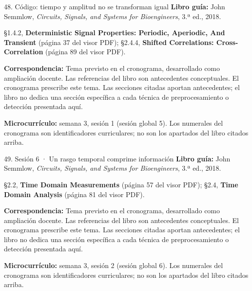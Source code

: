 \documentclass[
  10pt,
  ignorenonframetext,
  aspectratio=169,
  spanish,
]{beamer}
\begin{document}
\begin{frame}{48. Código: tiempo y amplitud no se transforman igual}
\label{cuxf3digo-tiempo-y-amplitud-no-se-transforman-igual}
\textbf{Libro guía:} John Semmlow, \emph{Circuits, Signals, and Systems
for Bioengineers}, 3.ª ed., 2018.

§1.4.2, \textbf{Deterministic Signal Properties: Periodic, Aperiodic,
And Transient} (página 37 del visor PDF); §2.4.4, \textbf{Shifted
Correlations: Cross-Correlation} (página 89 del visor PDF).

\textbf{Correspondencia:} Tema previsto en el cronograma, desarrollado
como ampliación docente. Las referencias del libro son antecedentes
conceptuales. El cronograma prescribe este tema. Las secciones citadas
aportan antecedentes; el libro no dedica una sección específica a cada
técnica de preprocesamiento o detección presentada aquí.

\textbf{Microcurrículo:} semana 3, sesión 1 (sesión global 5). Los
numerales del cronograma son identificadores curriculares; no son los
apartados del libro citados arriba.
\end{frame}

\begin{frame}{49. Sesión 6 · Un rasgo temporal comprime información}
\label{sesiuxf3n-6-un-rasgo-temporal-comprime-informaciuxf3n}
\textbf{Libro guía:} John Semmlow, \emph{Circuits, Signals, and Systems
for Bioengineers}, 3.ª ed., 2018.

§2.2, \textbf{Time Domain Measurements} (página 57 del visor PDF); §2.4,
\textbf{Time Domain Analysis} (página 81 del visor PDF).

\textbf{Correspondencia:} Tema previsto en el cronograma, desarrollado
como ampliación docente. Las referencias del libro son antecedentes
conceptuales. El cronograma prescribe este tema. Las secciones citadas
aportan antecedentes; el libro no dedica una sección específica a cada
técnica de preprocesamiento o detección presentada aquí.

\textbf{Microcurrículo:} semana 3, sesión 2 (sesión global 6). Los
numerales del cronograma son identificadores curriculares; no son los
apartados del libro citados arriba.
\end{frame}
\end{document}
